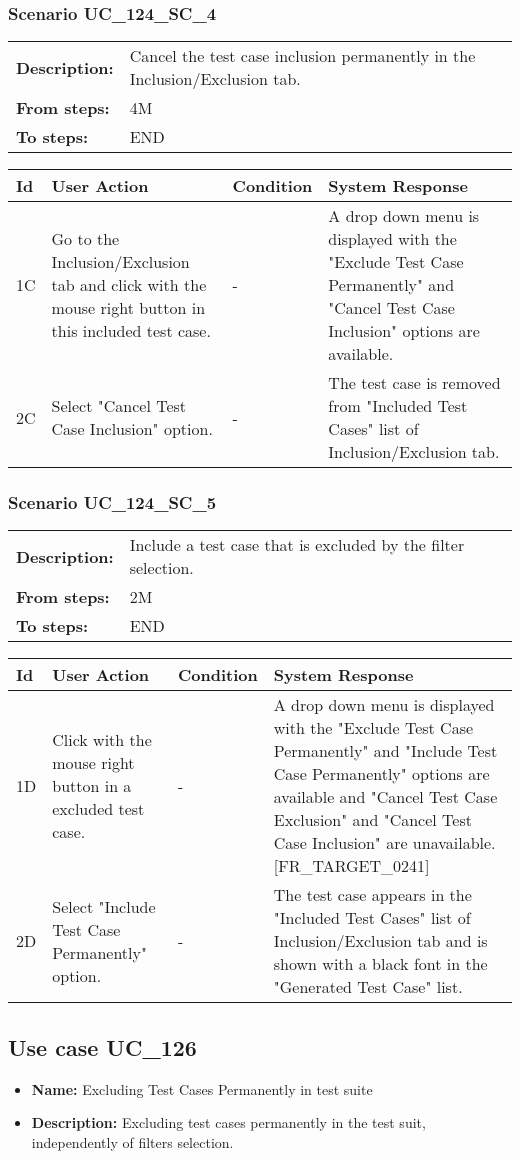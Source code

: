 \documentclass[a4paper,11pt]{article}
\newcommand{\bl}{\\ \hline}
\begin{document}
\subsubsection*{Scenario UC_124_SC_4}
\begin{tabular}{p{1in}p{4in}}
{\bf Description:} & Cancel the test case inclusion permanently in the Inclusion/Exclusion tab. \\
{\bf From steps:} & 4M \\
{\bf To steps:} & END \\
\end{tabular}
 
\begin{tabular}{|p{0.8in}|p{1.6in}|p{1.6in}|p{1.6in}|}
\hline
Id & User Action & Condition & System Response  \bl 
1C & Go to the Inclusion/Exclusion tab and click with the mouse right button in this included test case. & - & A drop down menu is displayed with the "Exclude Test Case Permanently" and "Cancel Test Case Inclusion" options are available. \bl 
2C & Select "Cancel Test Case Inclusion" option. & - & The test case is removed from "Included Test Cases" list of Inclusion/Exclusion tab. \bl 
\end{tabular}
\subsubsection*{Scenario UC_124_SC_5}
\begin{tabular}{p{1in}p{4in}}
{\bf Description:} & Include a test case that is excluded by the filter selection. \\
{\bf From steps:} & 2M \\
{\bf To steps:} & END \\
\end{tabular}
 
\begin{tabular}{|p{0.8in}|p{1.6in}|p{1.6in}|p{1.6in}|}
\hline
Id & User Action & Condition & System Response  \bl 
1D & Click with the mouse right button in a excluded test case. & - & A drop down menu is displayed with the "Exclude Test Case Permanently" and "Include Test Case Permanently" options are available and "Cancel Test Case Exclusion" and "Cancel Test Case Inclusion" are unavailable. [FR_TARGET_0241] \bl 
2D & Select "Include Test Case Permanently" option. & - & The test case appears in the "Included Test Cases" list of Inclusion/Exclusion tab and is shown with a black font in the "Generated Test Case" list. \bl 
\end{tabular}
\subsection*{Use case UC_126}
\begin{itemize}
\item {\bf Name: }Excluding Test Cases Permanently in test suite
\item {\bf Description: }Excluding test cases permanently in the test suit, independently of filters selection.
\end{itemize}
\end{document}
